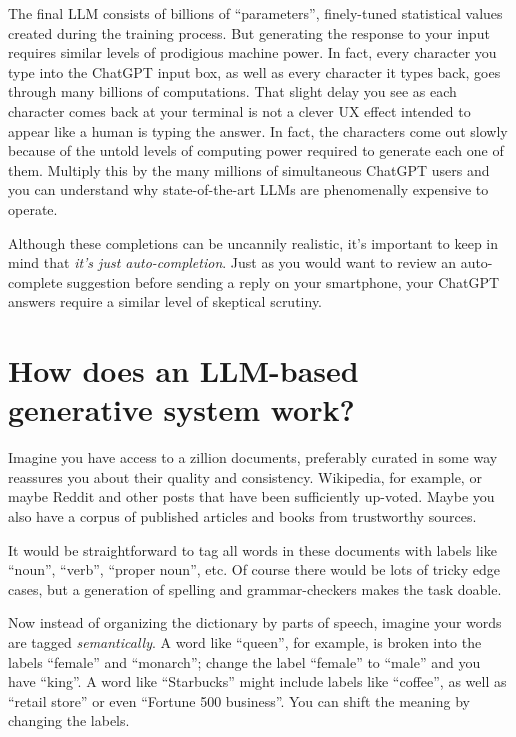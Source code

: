\documentclass[
  Letterpaper,
]{scrbook}
\begin{document}
The final LLM consists of billions of ``parameters'', finely-tuned
statistical values created during the training process. But generating
the response to your input requires similar levels of prodigious machine
power. In fact, every character you type into the ChatGPT input box, as
well as every character it types back, goes through many billions of
computations. That slight delay you see as each character comes back at
your terminal is not a clever UX effect intended to appear like a human
is typing the answer. In fact, the characters come out slowly because of
the untold levels of computing power required to generate each one of
them. Multiply this by the many millions of simultaneous ChatGPT users
and you can understand why state-of-the-art LLMs are phenomenally
expensive to operate.

Although these completions can be uncannily realistic, it's important to
keep in mind that \emph{it's just auto-completion}. Just as you would
want to review an auto-complete suggestion before sending a reply on
your smartphone, your ChatGPT answers require a similar level of
skeptical scrutiny.

\section{How does an LLM-based generative system
work?}\label{how-does-an-llm-based-generative-system-work}

Imagine you have access to a zillion documents, preferably curated in
some way reassures you about their quality and consistency. Wikipedia,
for example, or maybe Reddit and other posts that have been sufficiently
up-voted. Maybe you also have a corpus of published articles and books
from trustworthy sources.

It would be straightforward to tag all words in these documents with
labels like ``noun'', ``verb'', ``proper noun'', etc. Of course there
would be lots of tricky edge cases, but a generation of spelling and
grammar-checkers makes the task doable.

Now instead of organizing the dictionary by parts of speech, imagine
your words are tagged \emph{semantically}. A word like ``queen'', for
example, is broken into the labels ``female'' and ``monarch''; change
the label ``female'' to ``male'' and you have ``king''. A word like
``Starbucks'' might include labels like ``coffee'', as well as ``retail
store'' or even ``Fortune 500 business''. You can shift the meaning by
changing the labels.
\end{document}
